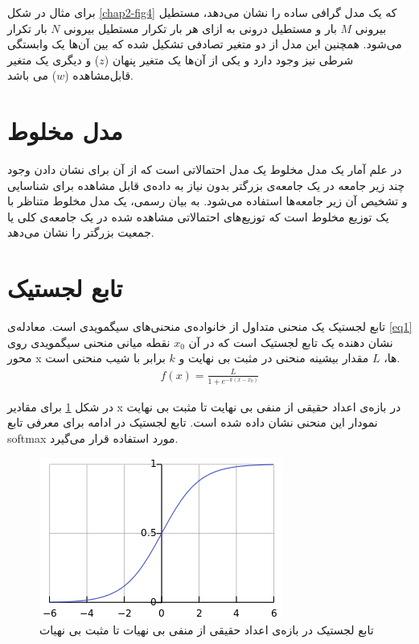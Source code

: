 برای مثال در شکل
\ref{chap2-fig4}
که یک مدل گرافی ساده را نشان می‌‌دهد، مستطیل بیرونی
$M$
بار و مستطیل درونی به ازای هر بار تکرار مستطیل بیرونی
$N$
بار تکرار می‌‌شود. همچنین این مدل از دو متغیر تصادفی تشکیل شده که بین آن‌ها یک وابستگی شرطی نیز وجود دارد و یکی‌ از آن‌ها یک متغیر پنهان
($z$)
و دیگری یک متغیر قابل‌مشاهده
($w$)
می‌ باشد.
\section{مدل مخلوط}
در علم آمار یک مدل مخلوط
یک مدل احتمالاتی است که از آن برای نشان دادن وجود چند زیر جامعه
در یک جامعه‌ی بزرگتر بدون نیاز به داده‌ی قابل مشاهده برای شناسایی‌ و تشخیص آن زیر جامعه‌ها استفاده می‌‌‌شود. به بیان رسمی‌، یک مدل مخلوط متناظر با یک توزیع مخلوط
 است که توزیع‌های احتمالاتی مشاهده شده در یک جامعه‌ی کلی‌ یا جمعیت بزرگتر را نشان می‌‌دهد.
	
\section{تابع لجستیک}
تابع لجستیک
 یک منحنی متداول از خانواده‌ی منحنی‌های سیگمویدی
  است. معاد‌له‌ی
\ref{eq1}
نشان دهنده یک تابع لجستیک است که در آن
$x_0$
نقطه میانی منحنی سیگمویدی روی محور
x
ها،
$L$
مقدار بیشینه منحنی در مثبت بی‌ نهایت و
$k$
برابر با شیب منحنی است.
\begin{align}
f(x) = \frac{L}{1+e^{-k(x-x_0)}}
\label{eq1}
\end{align}

 در شکل
\ref{fig3}
برای مقادیر x در بازه‌ی اعداد حقیقی‌ از منفی‌ بی‌ نهایت تا مثبت بی‌ نهایت نمودار این منحنی نشان داده شده است. تابع لجستیک در ادامه برای معرفی تابع
softmax
مورد استفاده قرار می‌‌گیرد.
\begin{figure}[!h]
	\centering
	\includegraphics[scale=0.5]{chap2-img/logistic_function}
	\caption{تابع لجستیک در بازه‌ی اعداد حقیقی‌ از منفی‌ بی‌ نهیات تا مثبت بی‌ نهیات }
	\label{fig3}
\end{figure}

